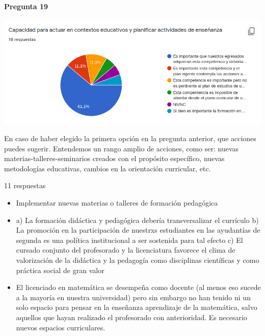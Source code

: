 \documentclass[a4paper,10pt,BCOR10mm,oneside,headsepline]{scrbook}
\begin{document}
\begin{subappendices}
 
 
 
 
 
 
     \paragraph{Pregunta 19}
\begin{center}
 
\includegraphics[scale=.9]{doc19.png}
 \end{center}
 
 
 
 
 
 En caso de haber elegido la primera opción en la pregunta anterior, que acciones puedes sugerir. Entendemos un rango amplio de acciones, como ser: nuevas materias-talleres-seminarios creados con el propósito específico, nuevas metodologías educativas, cambios en la orientación curricular, etc. 
 
 11 respuestas
 
 \begin{itemize}
\item  Implementar nuevas materias o talleres de formación pedagógica

\item  a) La formación didáctica y pedagógica debería transversalizar el currículo b) La promoción en la participación de nuestrxs estudiantes en las ayudantías de segunda es una política institucional a ser sostenida para tal efecto c) El cursado conjunto del profesorado y la licenciatura favorece el clima de valorización de la didáctica y la pedagogía como disciplinas científicas y como práctica social de gran valor 

\item  El licenciado en matemática se desempeña como docente (al menos eso sucede a la mayoría en nuestra universidad) pero sin embargo no han tenido ni un solo espacio para pensar en la enseñanza aprendizaje de la matemática, salvo aquellos que hayan realizado el profesorado con anterioridad. Es necesario nuevos espacios curriculares.


\end{itemize}
\end{subappendices}
\end{document}
